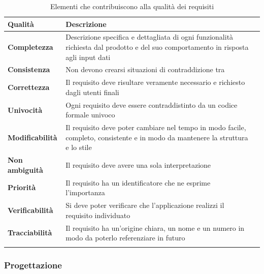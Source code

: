 \setlength{\freewidth}{\dimexpr\textwidth-0\tabcolsep}
	\renewcommand{\arraystretch}{1.5}
	\setlength{\aboverulesep}{0pt}
	\setlength{\belowrulesep}{0pt}
	\begin{longtable}{L{.15\freewidth} L{.6\freewidth} L{.080\freewidth}}
		\textbf{Qualità} & \textbf{Descrizione} \\
		\toprule
		\endhead		
		\textbf{Completezza} &  Descrizione specifica e dettagliata di ogni funzionalità richiesta dal prodotto  e del suo comportamento in risposta agli input dati\\
		\textbf{Consistenza} &  Non devono crearsi situazioni di contraddizione tra \\
		\textbf{Correttezza} &  Il requisito deve risultare veramente necessario e richiesto dagli utenti finali\\
		\textbf{Univocità} & Ogni requisito deve essere contraddistinto da un codice formale univoco \\
		\textbf{Modificabilità} &  Il requisito deve poter cambiare nel tempo in modo facile, completo, consistente e in modo da mantenere la struttura e lo stile\\
		\textbf{Non ambiguità} &  Il requisito deve avere una sola interpretazione\\
		\textbf{Priorità} &  Il requisito ha un identificatore che ne esprime l'importanza\\
		\textbf{Verificabilità} &  Si deve poter verificare che l'applicazione realizzi il requisito individuato\\
		\textbf{Tracciabilità} &  Il requisito ha un'origine chiara, un nome e un numero in modo da poterlo referenziare in futuro\\
		\bottomrule
		\hiderowcolors
		\caption{Elementi che contribuiscono alla qualità dei requisiti}
	\end{longtable}

\subsubsection{Progettazione}

